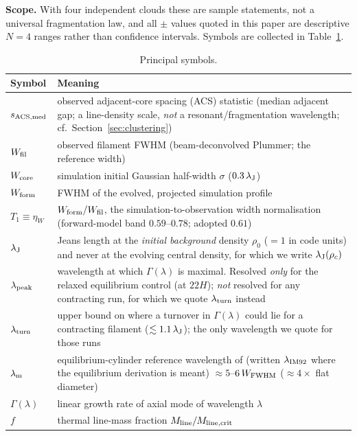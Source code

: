 \documentclass[usenatbib,twoside,twocolumn]{mnras}
\begin{document}
\smallskip\noindent\textbf{Scope.} With four independent clouds these are sample statements, not a universal fragmentation law, and all $\pm$ values quoted in this paper are descriptive $N=4$ ranges rather than confidence intervals. Symbols are collected in Table~\ref{tab:symbols}.

\begin{table}
\caption{Principal symbols.}
\label{tab:symbols}
\footnotesize
\setlength{\tabcolsep}{4pt}
\begin{tabular}{lp{6.1cm}}
\toprule
Symbol & Meaning \\
\midrule
$s_{\rm ACS,med}$ & observed adjacent-core spacing (ACS) statistic (median adjacent gap; a line-density scale, \emph{not} a resonant/fragmentation wavelength; cf.\ Section~\ref{sec:clustering}) \\
$W_{\rm fil}$ & observed filament FWHM (beam-deconvolved Plummer; the reference width) \\
$W_{\rm core}$ & simulation initial Gaussian half-width $\sigma$ ($0.3\,\lambda_{\rm J}$) \\
$W_{\rm form}$ & FWHM of the evolved, projected simulation profile \\
$T_1\!\equiv\!\eta_W$ & $W_{\rm form}/W_{\rm fil}$, the simulation-to-observation width normalisation (forward-model band $0.59$--$0.78$; adopted $0.61$) \\
$\lambda_{\rm J}$ & Jeans length at the \emph{initial background} density $\rho_0$ ($=1$ in code units) and never at the evolving central density, for which we write $\lambda_{\rm J}(\rho_c)$ \\
$\lambda_{\rm peak}$ & wavelength at which $\Gamma(\lambda)$ is maximal. Resolved \emph{only} for the relaxed equilibrium control (at $22H$); \emph{not} resolved for any contracting run, for which we quote $\lambda_{\rm turn}$ instead \\
$\lambda_{\rm turn}$ & upper bound on where a turnover in $\Gamma(\lambda)$ could lie for a contracting filament ($\lesssim1.1\,\lambda_{\rm J}$); the only wavelength we quote for those runs \\
$\lambda_{\rm m}$ & equilibrium-cylinder reference wavelength of \citet{Inutsuka1992} (written $\lambda_{\rm IM92}$ where the equilibrium derivation is meant) $\approx5$--$6\,W_{\rm FWHM}$ ($\approx4\times$ flat diameter) \\
$\Gamma(\lambda)$ & linear growth rate of axial mode of wavelength $\lambda$ \\
$f$ & thermal line-mass fraction $M_{\rm line}/M_{\rm line,crit}$ \\

\end{tabular}
\end{table}
\end{document}
